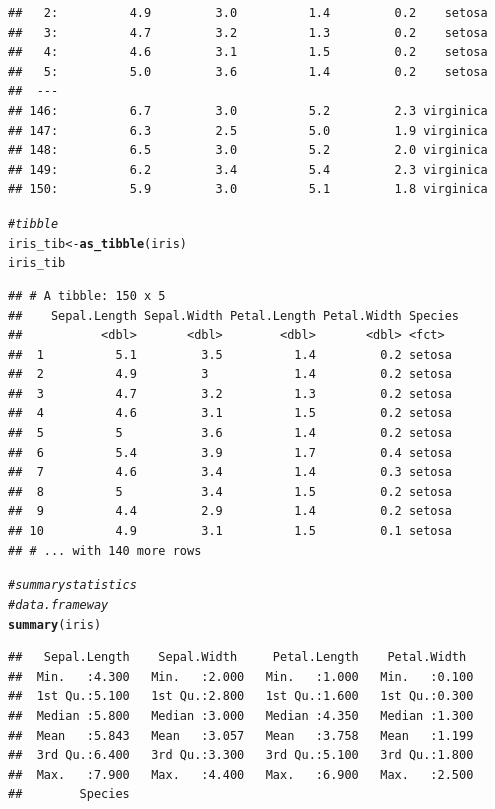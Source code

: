 \documentclass[11pt]{article}\usepackage[]{graphicx}\usepackage[]{color}
\makeatletter
\newcommand{\hlcom}[1]{\textcolor[rgb]{0.678,0.584,0.686}{\textit{#1}}}%
\newcommand{\hlstd}[1]{\textcolor[rgb]{0.345,0.345,0.345}{#1}}%
\newcommand{\hlkwb}[1]{\textcolor[rgb]{0.69,0.353,0.396}{#1}}%
\newcommand{\hlkwd}[1]{\textcolor[rgb]{0.737,0.353,0.396}{\textbf{#1}}}%
\newenvironment{kframe}{%
 \def\at@end@of@kframe{}%
 \ifinner\ifhmode%
  \def\at@end@of@kframe{\end{minipage}}%
  \begin{minipage}{\columnwidth}%
 \fi\fi%
 \def\FrameCommand##1{\hskip\@totalleftmargin \hskip-\fboxsep
 \colorbox{shadecolor}{##1}\hskip-\fboxsep
     \hskip-\linewidth \hskip-\@totalleftmargin \hskip\columnwidth}%
 \MakeFramed {\advance\hsize-\width
   \@totalleftmargin\z@ \linewidth\hsize
   \@setminipage}}%
 {\par\unskip\endMakeFramed%
 \at@end@of@kframe}
\newenvironment{knitrout}{}{} %
\makeatother
\begin{document}
\begin{knitrout}
\begin{kframe}
\begin{verbatim}
##   2:          4.9         3.0          1.4         0.2    setosa
##   3:          4.7         3.2          1.3         0.2    setosa
##   4:          4.6         3.1          1.5         0.2    setosa
##   5:          5.0         3.6          1.4         0.2    setosa
##  ---                                                            
## 146:          6.7         3.0          5.2         2.3 virginica
## 147:          6.3         2.5          5.0         1.9 virginica
## 148:          6.5         3.0          5.2         2.0 virginica
## 149:          6.2         3.4          5.4         2.3 virginica
## 150:          5.9         3.0          5.1         1.8 virginica
\end{verbatim}
\begin{alltt}
\hlcom{# tibble}
\hlstd{iris_tib} \hlkwb{<-} \hlkwd{as_tibble}\hlstd{(iris)}
\hlstd{iris_tib}
\end{alltt}
\begin{verbatim}
## # A tibble: 150 x 5
##    Sepal.Length Sepal.Width Petal.Length Petal.Width Species
##           <dbl>       <dbl>        <dbl>       <dbl> <fct>  
##  1          5.1         3.5          1.4         0.2 setosa 
##  2          4.9         3            1.4         0.2 setosa 
##  3          4.7         3.2          1.3         0.2 setosa 
##  4          4.6         3.1          1.5         0.2 setosa 
##  5          5           3.6          1.4         0.2 setosa 
##  6          5.4         3.9          1.7         0.4 setosa 
##  7          4.6         3.4          1.4         0.3 setosa 
##  8          5           3.4          1.5         0.2 setosa 
##  9          4.4         2.9          1.4         0.2 setosa 
## 10          4.9         3.1          1.5         0.1 setosa 
## # ... with 140 more rows
\end{verbatim}
\begin{alltt}
\hlcom{# summary statistics}
\hlcom{# data.frame way}
\hlkwd{summary}\hlstd{(iris)}
\end{alltt}
\begin{verbatim}
##   Sepal.Length    Sepal.Width     Petal.Length    Petal.Width   
##  Min.   :4.300   Min.   :2.000   Min.   :1.000   Min.   :0.100  
##  1st Qu.:5.100   1st Qu.:2.800   1st Qu.:1.600   1st Qu.:0.300  
##  Median :5.800   Median :3.000   Median :4.350   Median :1.300  
##  Mean   :5.843   Mean   :3.057   Mean   :3.758   Mean   :1.199  
##  3rd Qu.:6.400   3rd Qu.:3.300   3rd Qu.:5.100   3rd Qu.:1.800  
##  Max.   :7.900   Max.   :4.400   Max.   :6.900   Max.   :2.500  
##        Species  

\end{verbatim}
\end{kframe}
\end{knitrout}
\end{document}
